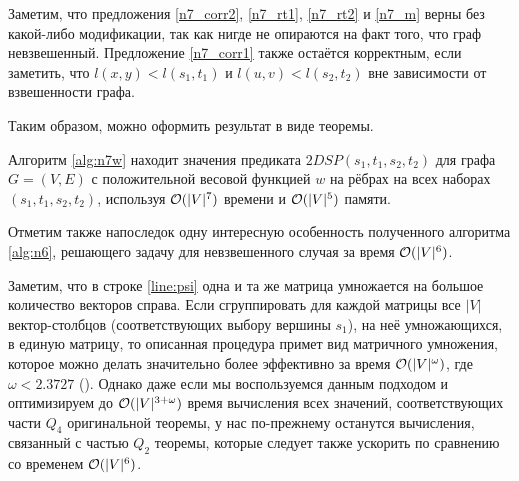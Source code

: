 Заметим, что предложения \ref{n7_corr2}, \ref{n7_rt1}, \ref{n7_rt2} и \ref{n7_m} верны без какой-либо модификации, так как нигде не опираются на факт того, что граф невзвешенный. Предложение \ref{n7_corr1} также остаётся корректным, если заметить, что $l(x, y) < l(s_1, t_1)$ и $l(u, v) < l(s_2, t_2)$ вне зависимости от взвешенности графа.

Таким образом, можно оформить результат в виде теоремы.

\begin{theorem}
Алгоритм \ref{alg:n7w} находит значения предиката $2DSP(s_1, t_1, s_2, t_2)$ для графа $G = (V, E)$ с положительной весовой функцией $w$ на рёбрах на всех наборах $(s_1, t_1, s_2, t_2)$, используя $\mathcal{O}(|V|^7)$ времени и $\mathcal{O}(|V|^5)$ памяти. 
\end{theorem}

Отметим также напоследок одну интересную особенность полученного алгоритма \ref{alg:n6}, решающего задачу для невзвешенного случая за время $\mathcal{O}(|V|^6)$. 

Заметим, что в строке \ref{line:psi} одна и та же матрица умножается на большое количество векторов справа. Если сгруппировать для каждой матрицы все $|V|$ вектор-столбцов (соответствующих выбору вершины $s_1$), на неё умножающихся, в единую матрицу, то описанная процедура примет вид матричного умножения, которое можно делать значительно более эффективно за время $\mathcal{O}(|V|^\omega)$, где $\omega < 2.3727$ (\cite{Williams}). Однако даже если мы воспользуемся данным подходом и оптимизируем до $\mathcal{O}(|V|^{3+\omega})$ время вычисления всех значений, соответствующих части $Q_4$ оригинальной теоремы, у нас по-прежнему останутся вычисления, связанный с частью $Q_2$ теоремы, которые следует также ускорить по сравнению со временем $\mathcal{O}(|V|^6)$.


